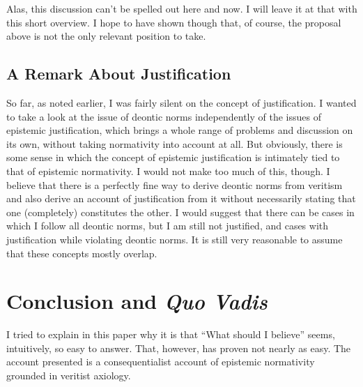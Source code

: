 \documentclass[12pt,numbers=noenddot]{scrartcl}
\begin{document}
Alas, this discussion can't be spelled out here and now. I will leave it at that with this short overview. I hope to have shown though that, of course, the proposal above is not the only relevant position to take.

\subsection{A Remark About Justification}

So far, as noted earlier, I was fairly silent on the concept of justification. I wanted to take a look at the issue of deontic norms independently of the issues of epistemic justification, which brings a whole range of problems and discussion on its own, without taking normativity into account at all. But obviously, there is some sense in which the concept of epistemic justification is intimately tied to that of epistemic normativity.
I would not make too much of this, though. I believe that there is a perfectly fine way to derive deontic norms from veritism and also derive an account of justification from it without necessarily stating that one (completely) constitutes the other. I would suggest that there can be cases in which I follow all deontic norms, but I am still not justified, and cases with justification while violating deontic norms. It is still very reasonable to assume that these concepts mostly overlap.

\clearpage
\section{Conclusion and \emph{Quo Vadis}}

I tried to explain in this paper why it is that “What should I believe” seems, intuitively, so easy to answer. That, however, has proven not nearly as easy. The account presented is a consequentialist account of epistemic normativity grounded in veritist axiology.
\end{document}
